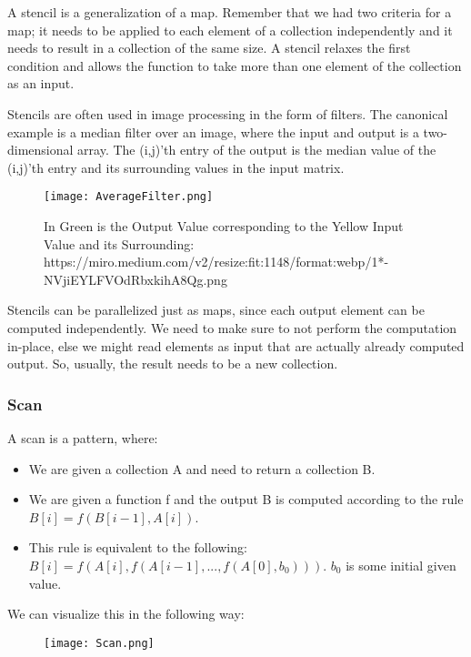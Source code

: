 \documentclass[main.tex]{subfiles}
\begin{document}
A stencil is a generalization of a map. Remember that we had two criteria for a map; it needs to be applied to each element of a collection independently and it needs to result in a collection of the same size. A stencil relaxes the first condition and allows the function to take more than one element of the collection as an input.

Stencils are often used in image processing in the form of filters. The canonical example is a median filter over an image, where the input and output is a two-dimensional array. The (i,j)'th entry of the output is the median value of the (i,j)'th entry and its surrounding values in the input matrix.

\begin{figure}[H]
    \centering
    \texttt{[image: AverageFilter.png]}
    \caption{In Green is the Output Value corresponding to the Yellow Input Value and its Surrounding: https://miro.medium.com/v2/resize:fit:1148/format:webp/1*-NVjiEYLFVOdRbxkihA8Qg.png}
\end{figure}

Stencils can be parallelized just as maps, since each output element can be computed independently. We need to make sure to not perform the computation in-place, else we might read elements as input that are actually already computed output. So, usually, the result needs to be a new collection.

\subsubsection{Scan}
A scan is a pattern, where:

\begin{itemize}
  \item We are given a collection A and need to return a collection B.
  \item We are given a function f and the output B is computed according to the rule \(B[i] = f(B[i-1], A[i])\).
        \item This rule is equivalent to the following: \(B[i] = f(A[i], f(A[i-1], ... , f(A[0], b_{0})))\). \(b_{0}\) is some initial given value.
\end{itemize}

\noindent We can visualize this in the following way:

\begin{figure}[H]
    \centering
    \texttt{[image: Scan.png]}
\end{figure}
\end{document}
